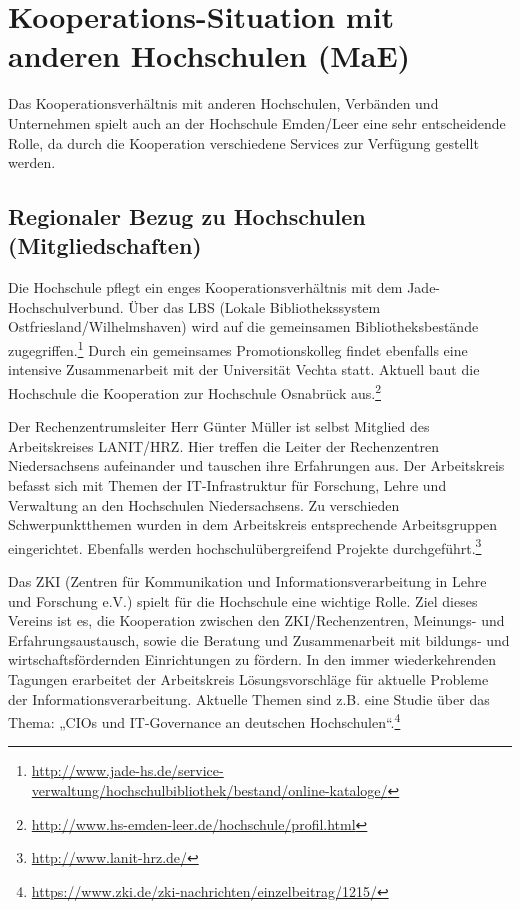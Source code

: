 \section{Kooperations-Situation mit anderen Hochschulen (MaE)}
\label{section_kooperations_situation}

Das Kooperationsverhältnis mit anderen Hochschulen, Verbänden und Unternehmen spielt auch an der Hochschule Emden/Leer eine sehr entscheidende Rolle, da durch die Kooperation verschiedene Services zur Verfügung gestellt werden.

\subsection{Regionaler Bezug zu Hochschulen (Mitgliedschaften)}
Die Hochschule pflegt ein enges Kooperationsverhältnis mit dem Jade-Hochschulverbund. Über das LBS (Lokale Bibliothekssystem Ostfriesland/Wilhelmshaven) wird auf die gemeinsamen  Bibliotheksbestände zugegriffen.\footnote{\url{http://www.jade-hs.de/service-verwaltung/hochschulbibliothek/bestand/online-kataloge/}} Durch ein gemeinsames Promotionskolleg findet ebenfalls eine intensive Zusammenarbeit mit der Universität Vechta statt. Aktuell baut die Hochschule die Kooperation zur Hochschule Osnabrück aus.\footnote{\url{http://www.hs-emden-leer.de/hochschule/profil.html}}

Der Rechenzentrumsleiter Herr Günter Müller ist selbst Mitglied des Arbeitskreises LANIT/HRZ. Hier treffen die Leiter der Rechenzentren Niedersachsens aufeinander und tauschen ihre Erfahrungen aus. Der Arbeitskreis befasst sich mit Themen der IT-Infrastruktur für Forschung, Lehre und Verwaltung an den Hochschulen Niedersachsens. Zu verschieden Schwerpunktthemen wurden in dem Arbeitskreis entsprechende Arbeitsgruppen eingerichtet.  Ebenfalls werden hochschulübergreifend Projekte durchgeführt.\footnote{\url{http://www.lanit-hrz.de/}}

Das ZKI (Zentren für Kommunikation und Informationsverarbeitung in Lehre und Forschung e.V.) spielt für die Hochschule eine wichtige Rolle. Ziel dieses Vereins ist es, die Kooperation zwischen den ZKI/Rechenzentren, Meinungs- und Erfahrungsaustausch, sowie die Beratung und Zusammenarbeit mit bildungs- und wirtschaftsfördernden Einrichtungen zu fördern. In den immer wiederkehrenden Tagungen erarbeitet der Arbeitskreis Lösungsvorschläge für aktuelle Probleme der Informationsverarbeitung. Aktuelle Themen sind z.B. eine Studie über das Thema: „CIOs und IT-Governance an deutschen Hochschulen“.\footnote{\url{https://www.zki.de/zki-nachrichten/einzelbeitrag/1215/}}

